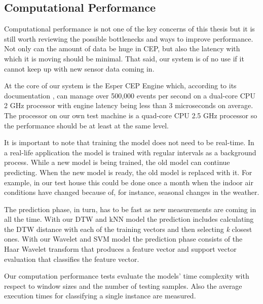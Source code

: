 \subsection{Computational Performance}
Computational performance is not one of the key concerns of this thesis but it is still worth reviewing the possible bottlenecks and ways to improve performance. Not only can the amount of data be huge in CEP, but also the latency with which it is moving should be minimal. That said, our system is of no use if it cannot keep up with new sensor data coming in.

At the core of our system is the Esper CEP Engine which, according to its documentation \cite{EsperReference}, can manage over 500,000 events per second on a dual-core CPU 2 GHz processor with engine latency being less than 3 microseconds on average. The processor on our own test machine is a quad-core CPU 2.5 GHz processor so the performance should be at least at the same level.

It is important to note that training the model does not need to be real-time. In a real-life application the model is trained with regular intervals as a background process. While a new model is being trained, the old model can continue predicting. When the new model is ready, the old model is replaced with it. For example, in our test house this could be done once a month when the indoor air conditions have changed because of, for instance, seasonal changes in the weather.

The prediction phase, in turn, has to be fast as new measurements are coming in all the time. With our DTW and kNN model the prediction includes calculating the DTW distance with each of the training vectors and then selecting \emph{k} closest ones. With our Wavelet and SVM model the prediction phase consists of the Haar Wavelet transform that produces a feature vector and support vector evaluation that classifies the feature vector.

Our computation performance tests evaluate the models' time complexity with respect to window sizes and the number of testing samples. Also the average execution times for classifying a single instance are measured.
